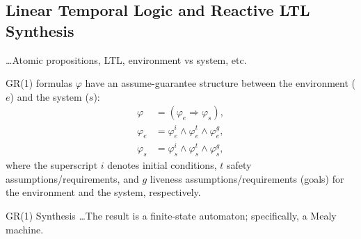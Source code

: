 \subsection{Linear Temporal Logic and Reactive LTL Synthesis}\label{S:GR1}

\ldots Atomic propositions, LTL, environment vs system, etc.

GR(1) formulas $\varphi$ have an assume-guarantee structure between the environment ($e$) and the system ($s$):
\begin{equation}\label{GR1Formula}
\begin{split}
	\varphi &= (\varphi_e \Rightarrow \varphi_s),\\
	\varphi_e &= \varphi_e^i \wedge \varphi_e^t \wedge \varphi_e^g,\\
	\varphi_s &= \varphi_s^i \wedge \varphi_s^t \wedge \varphi_s^g,
\end{split}
\end{equation}
where the superscript $i$ denotes initial conditions, $t$ safety assumptions/requirements, and $g$ liveness assumptions/requirements (goals) for the environment and the system, respectively. 

GR(1) Synthesis \cite{piterman_06} \ldots The result is a finite-state automaton; specifically, a Mealy machine.

